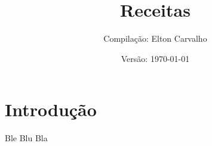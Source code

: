 \documentclass[a4paper]{recipe}
\title{\Huge\bf Receitas}
\author{Compilação: Elton Carvalho}
\date{Versão: \today}
\begin{document}
\frontmatter
\maketitle
\section*{Introdução}
Ble Blu Bla

\tableofcontents
\mainmatter


\backmatter
\printindex
\end{document}
